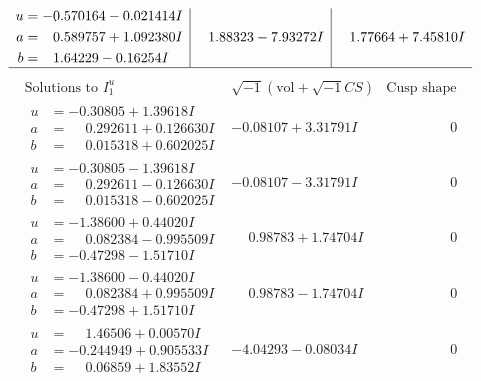 \documentclass[1p]{elsarticle_modified}
\theoremstyle{definition}
\newcommand{\I}{\sqrt{-1}}
\begin{document}
$$\begin{array}{c|c|c}
\begin{aligned}
u &= -0.570164 - 0.021414 I \\
a &= \phantom{-}0.589757 + 1.092380 I \\
b &= \phantom{-}1.64229 - 0.16254 I\end{aligned}
 & \phantom{-}1.88323 - 7.93272 I & \phantom{-}1.77664 + 7.45810 I\\
 \hline 
 \end{array}$$\newpage$$\begin{array}{c|c|c}  
\text{Solutions to }I^u_{1}& \I (\text{vol} + \sqrt{-1}CS) & \text{Cusp shape}\\
 \hline 
\begin{aligned}
u &= -0.30805 + 1.39618 I \\
a &= \phantom{-}0.292611 + 0.126630 I \\
b &= \phantom{-}0.015318 + 0.602025 I\end{aligned}
 & -0.08107 + 3.31791 I & \phantom{-0.000000 } 0 \\ \hline\begin{aligned}
u &= -0.30805 - 1.39618 I \\
a &= \phantom{-}0.292611 - 0.126630 I \\
b &= \phantom{-}0.015318 - 0.602025 I\end{aligned}
 & -0.08107 - 3.31791 I & \phantom{-0.000000 } 0 \\ \hline\begin{aligned}
u &= -1.38600 + 0.44020 I \\
a &= \phantom{-}0.082384 - 0.995509 I \\
b &= -0.47298 - 1.51710 I\end{aligned}
 & \phantom{-}0.98783 + 1.74704 I & \phantom{-0.000000 } 0 \\ \hline\begin{aligned}
u &= -1.38600 - 0.44020 I \\
a &= \phantom{-}0.082384 + 0.995509 I \\
b &= -0.47298 + 1.51710 I\end{aligned}
 & \phantom{-}0.98783 - 1.74704 I & \phantom{-0.000000 } 0 \\ \hline\begin{aligned}
u &= \phantom{-}1.46506 + 0.00570 I \\
a &= -0.244949 + 0.905533 I \\
b &= \phantom{-}0.06859 + 1.83552 I\end{aligned}
 & -4.04293 - 0.08034 I & \phantom{-0.000000 } 0 \\ \hline\begin{aligned}

\end{aligned}
\end{array}$$
\end{document}
